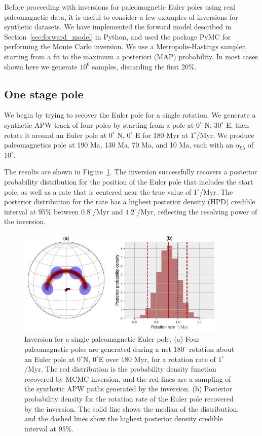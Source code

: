 \documentclass[preprint,12pt,authoryear]{elsarticle}
\begin{document}
Before proceeding with inversions for paleomagnetic Euler poles using real paleomagnetic data,
it is useful to consider a few examples of inversions for synthetic datasets.
We have implemented the forward model described in Section~\ref{sec:forward_model}
in Python, and used the package PyMC \citep{patil2010pymc} for performing the Monte Carlo inversion.
We use a Metropolis-Hastings sampler, starting from a fit to the maximum a posteriori (MAP) probability.
In most cases shown here we generate $10^6$ samples, discarding the first 20\%.

\subsection{One stage pole}
\label{sec:one_stage_pole}
We begin by trying to recover the Euler pole for a single rotation.
We generate a synthetic APW track of four poles by starting from a pole at $0^\circ$ N, $30^\circ$ E,
then rotate it around an Euler pole at $0^\circ$ N, $0^\circ$ E for 180 Myr at $1^\circ$/Myr.
We produce paleomagnetics pole at 190 Ma, 130 Ma, 70 Ma, and 10 Ma, each with an $\alpha_{95}$
of $10^\circ$.

The results are shown in Figure~\ref{fig:one_euler_pole}.
The inversion successfully recovers a posterior probability distribution for the position
of the Euler pole that includes the start pole, as well as a rate that is centered
near the true value of $1^\circ$/Myr. The posterior distribution for the rate
has a highest posterior density (HPD) credible interval at 95\%
between $0.8^\circ$/Myr and $1.2^\circ$/Myr, reflecting the resolving power of the inversion.

\begin{figure}
\includegraphics[width=0.9\textwidth]{figures/synthetic/one_euler_pole.pdf}
\caption[Inversion for a single paleomagnetic Euler pole.]{Inversion for a single paleomagnetic Euler pole. (a) Four paleomagnetic poles are generated during a net $180^\circ$ rotation about an Euler pole at $0^\circ$N, $0^\circ$E over 180 Myr, for a rotation rate of $1^\circ$/Myr. The red distribution is the probability density function recovered by MCMC inversion, and the red lines are a sampling of the synthetic APW paths generated by the inversion. (b) Posterior probability density for the rotation rate of the Euler pole recovered by the inversion. The solid line shows the median of the distribution, and the dashed lines show the highest posterior density credible interval at 95\%. }
\label{fig:one_euler_pole}
\end{figure}
\end{document}
